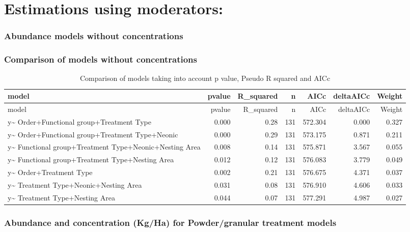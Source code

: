 \documentclass[]{elsarticle} %
\begin{document}
\section{Estimations using
moderators:}\label{estimations-using-moderators}

\subsubsection{Abundance models without
concentrations}\label{abundance-models-without-concentrations}

\subsubsection{Comparison of models without
concentrations}\label{comparison-of-models-without-concentrations}

\begin{longtable}[c]{@{}lrrrrrr@{}}
\caption{Comparison of models taking into account p value, Pseudo R
squared and AICc}\tabularnewline
\toprule
model & pvalue & R\_squared & n & AICc & deltaAICc &
Weight\tabularnewline
\midrule
\endfirsthead
\toprule
model & pvalue & R\_squared & n & AICc & deltaAICc &
Weight\tabularnewline
\midrule
\endhead
y\textasciitilde{} Order+Functional group+Treatment Type & 0.000 & 0.28
& 131 & 572.304 & 0.000 & 0.327\tabularnewline
y\textasciitilde{} Order+Functional group+Treatment Type+Neonic & 0.000
& 0.29 & 131 & 573.175 & 0.871 & 0.211\tabularnewline
y\textasciitilde{} Functional group+Treatment Type+Neonic+Nesting Area &
0.008 & 0.14 & 131 & 575.871 & 3.567 & 0.055\tabularnewline
y\textasciitilde{} Functional group+Treatment Type+Nesting Area & 0.012
& 0.12 & 131 & 576.083 & 3.779 & 0.049\tabularnewline
y\textasciitilde{} Order+Treatment Type & 0.002 & 0.21 & 131 & 576.675 &
4.371 & 0.037\tabularnewline
y\textasciitilde{} Treatment Type+Neonic+Nesting Area & 0.031 & 0.08 &
131 & 576.910 & 4.606 & 0.033\tabularnewline
y\textasciitilde{} Treatment Type+Nesting Area & 0.044 & 0.07 & 131 &
577.291 & 4.987 & 0.027\tabularnewline
\bottomrule
\end{longtable}

\subsubsection{Abundance and concentration (Kg/Ha) for Powder/granular
treatment
models}\label{abundance-and-concentration-kgha-for-powdergranular-treatment-models}
\end{document}
